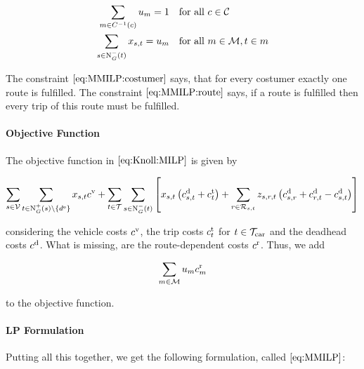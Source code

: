 \begin{align}
	\sum_{m\in C^{-1}(c)} u_m = 1 &&& \text{for all } c\in\mathcal{C} \label{eq:MMILP:costumer} \\
	\sum_{s\in\operatorname{N}_G^-(t)} x_{s,t} = u_m &&& \text{for all } m\in\mathcal{M}, t\in m \label{eq:MMILP:route}
\end{align}

The constraint $\eqref{eq:MMILP:costumer}$ says, that for every costumer exactly one route is fulfilled. The constraint $\eqref{eq:MMILP:route}$ says, if a route is fulfilled then every trip of this route must be fulfilled.

\paragraph{Objective Function} \parfill

The objective function in $\eqref{eq:Knoll:MILP}$ is given by

\begin{align*}
	\sum_{s\in\mathcal{V}} \sum_{t\in\operatorname{N}_G^+(s)\backslash\{d^{\operatorname{e}}\}} x_{s,t}c^{\operatorname{v}}	+ \sum_{t\in\mathcal{T}} \sum_{s\in\operatorname{N}_G^-(t)} \left[x_{s,t}\left(c^{\operatorname{d}}_{s,t}+c^{\operatorname{t}}_{t}\right) + \sum_{r\in\mathcal{R}_{s,t}} z_{s,r,t}\left(c^{\operatorname{d}}_{s,r}+c^{\operatorname{d}}_{r,t}-c^{\operatorname{d}}_{s,t}\right)\right]
\end{align*}

considering the vehicle costs $c^{\operatorname{v}}$, the trip costs $c^{\operatorname{t}}_t$ for $t\in\mathcal{T}_{\operatorname{car}}$ and the deadhead costs $c^{\operatorname{d}}$. What is missing, are the route-dependent costs $c^{\operatorname{r}}$. Thus, we add

\begin{align*}
	\sum_{m\in\mathcal{M}} u_m c^{\operatorname{r}}_m
\end{align*}

to the objective function.

\paragraph{LP Formulation} \parfill

Putting all this together, we get the following formulation, called $\eqref{eq:MMILP}$:

